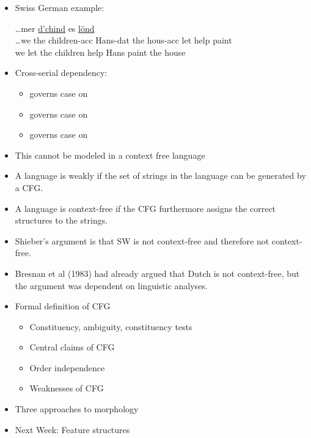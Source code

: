 \documentclass[a4paper,landscape,headrule,footrule]{foils}
\begin{document}
\begin{itemize}
\item Swiss German example:
  \begin{exe}
    \ex \gll \ldots mer \uline{d’chind}  es  \uline{l\"ond}  \\
    \ldots we {the children-acc} Hans-dat the hous-acc let help paint \\
    \trans we let {the children} help Hans paint the house 
  \end{exe}
\item Cross-serial dependency:
\begin{itemize}
\item {} governs case on 
\item {} governs case on 
\item {} governs case on 
\end{itemize}
\item This cannot be modeled in a context free language
\end{itemize}

\begin{itemize}
\item A language is weakly  if the set of
strings in the language can be generated by a CFG.
\item A language is  context-free if the CFG
furthermore assigns the correct structures to the
strings.
\item Shieber’s argument is that SW is not 
context-free and therefore not  context-free.
\item Bresnan et al (1983) had already argued that Dutch
is  not context-free, but the argument was
dependent on linguistic analyses.
\end{itemize}






\begin{itemize}
\item Formal definition of CFG
  \begin{itemize}
  \item Constituency, ambiguity, constituency tests
  \item Central claims of CFG
  \item Order independence
  \item Weaknesses of CFG
  \end{itemize}
\item Three approaches to morphology
\item Next Week: Feature structures
\end{itemize}
\end{document}
